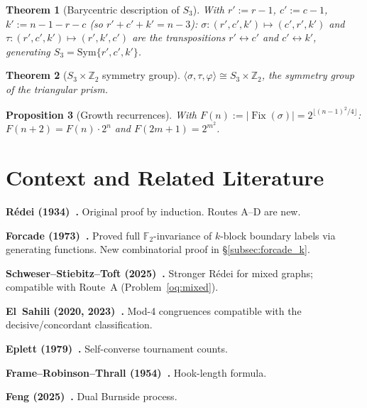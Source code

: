 \documentclass[12pt,reqno]{amsart}
\theoremstyle{plain}
\newtheorem{theorem}{Theorem}[section]
\newtheorem{proposition}[theorem]{Proposition}
\theoremstyle{definition}
\theoremstyle{remark}
\DeclareMathOperator{\Fix}{Fix}
\begin{document}
\begin{theorem}[Barycentric description of $S_3$]\label{thm:bary_st}
With $r' := r-1$, $c' := c-1$, $k' := n-1-r-c$ (so $r'+c'+k'=n-3$):
$\sigma:(r',c',k')\mapsto(c',r',k')$ and $\tau:(r',c',k')\mapsto(r',k',c')$
are the transpositions $r'\leftrightarrow c'$ and $c'\leftrightarrow k'$,
generating $S_3=\mathrm{Sym}\{r',c',k'\}$.
\end{theorem}

\begin{theorem}[$S_3\times\mathbb{Z}_2$ symmetry group]\label{thm:prism}
$\langle\sigma,\tau,\varphi\rangle\cong S_3\times\mathbb{Z}_2$,
the symmetry group of the triangular prism.
\end{theorem}

\begin{proposition}[Growth recurrences]\label{prop:growth}
With $F(n):=|\Fix(\sigma)|=2^{\lfloor(n-1)^2/4\rfloor}$:
$F(n+2)=F(n)\cdot 2^n$ and $F(2m+1)=2^{m^2}$.
\end{proposition}

\section{Context and Related Literature}
\label{sec:literature}

\textbf{Rédei (1934)~\cite{redei1934}.} Original proof by induction.
Routes A--D are new.

\textbf{Forcade (1973)~\cite{forcade1973}.} Proved full $\mathbb{F}_2$-invariance
of $k$-block boundary labels via generating functions. New combinatorial proof
in \S\ref{subsec:forcade_k}.

\textbf{Schweser--Stiebitz--Toft (2025)~\cite{schweser2025}.} Stronger Rédei
for mixed graphs; compatible with Route~A (Problem~\ref{oq:mixed}).

\textbf{El~Sahili (2020, 2023)~\cite{elsahili2020,elsahili2023}.} Mod-4
congruences compatible with the decisive/concordant classification.

\textbf{Eplett (1979)~\cite{eplett1979}.} Self-converse tournament counts.

\textbf{Frame--Robinson--Thrall (1954)~\cite{FRT54}.} Hook-length formula.

\textbf{Feng (2025)~\cite{feng2025dual}.} Dual Burnside process.

\end{document}
